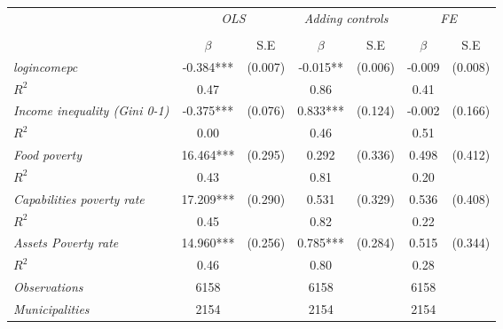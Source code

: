 


\begin{tabular}{lcccccc}


\hline
\hline

\multicolumn{1}{l}{} & \multicolumn{2}{c}{\textit{OLS}} & \multicolumn{2}{c}{\textit{Adding controls}} & \multicolumn{2}{c}{\textit{FE}}   \\ 

\cmidrule(l{1mm}r{1mm}){2-3} \cmidrule(l{1mm}r{1mm}){4-5} \cmidrule(l{1mm}r{1mm}){6-7}   \\
& $\beta$ & S.E & $\beta$ & S.E & $\beta$ & S.E \\
\hline


\textit{logincomepc}    &  -0.384***    & (0.007)      &   -0.015**        &  (0.006)      &     -0.009  &    (0.008)   \\
$R^{2}$			         &  0.47   & 	   &     0.86   	&		 &     0.41   &  \\
					
\textit{Income inequality (Gini 0-1)}    &  -0.375***    & (0.076)      &   0.833***        &  (0.124)      &     -0.002  &    (0.166)  \\
$R^{2}$			         &  0.00   & 	   &     0.46   	&		 &     0.51   &  \\
					
\textit{Food poverty}    &  16.464***    & (0.295)      &   0.292        &  (0.336)      &     0.498  &    (0.412)  \\
$R^{2}$			         &  0.43   & 	   &     0.81   	&		 &     0.20   &   \\
					
\textit{Capabilities poverty rate}    &  17.209***    & (0.290)      &   0.531        &  (0.329)      &     0.536  &    (0.408)  \\
$R^{2}$			         &  0.45   & 	   &     0.82   	&		 &     0.22   &  \\
					
\textit{Assets Poverty rate}    &  14.960***    & (0.256)      &   0.785***        &  (0.284)      &     0.515  &    (0.344)  \\
$R^{2}$			         &  0.46   & 	   &     0.80   	&		 &     0.28   &   \\


\hline		

\textit{Observations}              &   6158    &  & 6158    &  &  6158   &  		\\
\textit{Municipalities}               &   2154   &  & 2154   &  &  2154  &  		\\


\end{tabular}%
